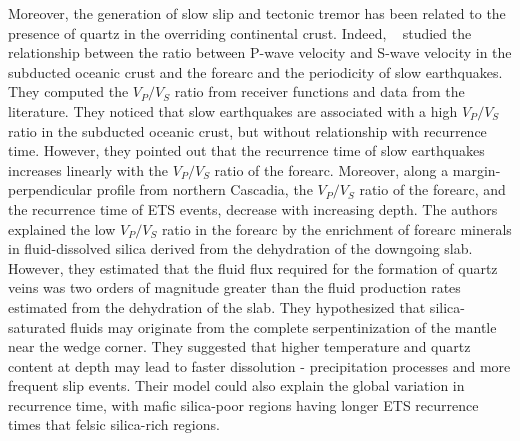 \documentclass[draft]{agujournal2019}
\begin{document}
Moreover, the generation of slow slip and tectonic tremor has been related to the presence of quartz in the overriding continental crust. Indeed, ~ studied the relationship between the ratio between P-wave velocity and S-wave velocity in the subducted oceanic crust and the forearc and the periodicity of slow earthquakes. They computed the $V_P / V_S$ ratio from receiver functions and data from the literature. They noticed that slow earthquakes are associated with a high $V_P / V_S$ ratio in the subducted oceanic crust, but without relationship with recurrence time. However, they pointed out that the recurrence time of slow earthquakes increases linearly with the $V_P / V_S$ ratio of the forearc. Moreover, along a margin-perpendicular profile from northern Cascadia, the $V_P / V_S$ ratio of the forearc, and the recurrence time of ETS events, decrease with increasing depth. The authors explained the low $V_P / V_S$ ratio in the forearc by the enrichment of forearc minerals in fluid-dissolved silica derived from the dehydration of the downgoing slab. However, they estimated that the fluid flux required for the formation of quartz veins was two orders of magnitude greater than the fluid production rates estimated from the dehydration of the slab. They hypothesized that silica-saturated fluids may originate from the complete serpentinization of the mantle near the wedge corner. They suggested that higher temperature and quartz content at depth may lead to faster dissolution - precipitation processes and more frequent slip events. Their model could also explain the global variation in recurrence time, with mafic silica-poor regions having longer ETS recurrence times that felsic silica-rich regions. \\
\end{document}
